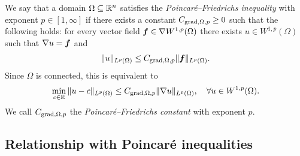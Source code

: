 \documentclass[10pt,a4paper]{article}
\begin{document}
We say that a domain $\Omega \subseteq {\mathbb R}^{n}$ satisfies the \emph{Poincar\'e--Friedrichs inequality} with exponent $p \in [1,\infty]$
if there exists a constant $C_{\operatorname{grad},\Omega,p} \geq 0$ such that the following holds:
for every vector field $\bm{f} \in \nabla W^{1,p}(\Omega)$ there exists $u \in W^{1,p}(\Omega)$
such that $\nabla u = \bm{f}$ and 
\begin{align}\label{math:inequalitypf:gradient}
    \| u \|_{L^{p}(\Omega)}
    \leq 
    C_{\operatorname{grad},\Omega,p} 
    \| \bm{f} \|_{L^{p}(\Omega)}
    .
\end{align}
Since $\Omega$ is connected, this is equivalent to  
\begin{align*}
    \min_{ c \in {\mathbb R} } \| u - c \|_{L^{p}(\Omega)}
    \leq 
    C_{\operatorname{grad},\Omega,p} 
    \| \nabla u \|_{L^{p}(\Omega)},
    \quad 
    \forall 
    u \in W^{1,p}(\Omega)
    .
\end{align*}
We call $C_{\operatorname{grad},\Omega,p}$ the \emph{Poincar\'e--Friedrichs constant} with exponent $p$. 


\subsection{Relationship with Poincar\'e inequalities}
\end{document}
